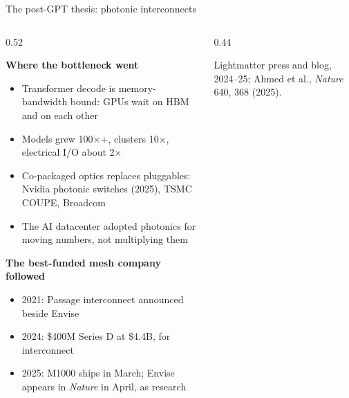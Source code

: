 \documentclass[aspectratio=169,10pt]{beamer}
\newcommand{\src}[1]{{\scriptsize\color{slate}#1}}
\newcommand{\stat}[2]{{\fontsize{24}{26}\selectfont\color{amber}\textbf{#1}}\\[-1pt]{\scriptsize\color{slate}#2}}
\begin{document}
\begin{frame}{The post-GPT thesis: photonic interconnects}
\begin{columns}[T]
\begin{column}{0.52\textwidth}
{\footnotesize
\textbf{Where the bottleneck went}
\begin{itemize}\setlength{\itemsep}{2pt}
  \item Transformer decode is memory-bandwidth bound: GPUs wait on HBM and on each other
  \item Models grew 100$\times$+, clusters 10$\times$, electrical I/O about 2$\times$
  \item Co-packaged optics replaces pluggables: Nvidia photonic switches (2025), TSMC COUPE, Broadcom
  \item The AI datacenter adopted photonics for \alert{moving} numbers, not multiplying them
\end{itemize}
\vspace{3pt}
\textbf{The best-funded mesh company followed}
\begin{itemize}\setlength{\itemsep}{2pt}
  \item 2021: Passage interconnect announced beside Envise
  \item 2024: \$400M Series D at \$4.4B, for interconnect
  \item 2025: M1000 ships in March; Envise appears in \emph{Nature} in April, as research
\end{itemize}}
\end{column}
\begin{column}{0.44\textwidth}
\begin{center}
\end{center}
\vspace{-2pt}
\src{Lightmatter press and blog, 2024--25; Ahmed et al., \emph{Nature} 640, 368 (2025).}
\end{column}
\end{columns}
\end{frame}
\end{document}
